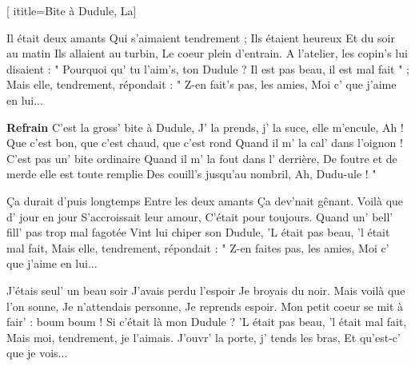[
  ititle={Bite à Dudule, La}]
  
\beginverse
Il était deux amants
Qui s'aimaient tendrement ;
Ils étaient heureux
Et du soir au matin
Ils allaient au turbin,
Le coeur plein d'entrain.
A l'atelier, les copin's lui disaient :
" Pourquoi qu' tu l'aim's, ton Dudule ?
Il est pas beau, il est mal fait " ;
Mais elle, tendrement, répondait :
" Z-en fait's pas, les amies,
Moi c' que j'aime en lui...
\endverse

\beginchorus
\textbf{Refrain}
C'est la gross' bite à Dudule,
J' la prends, j' la suce, elle m'encule,
Ah ! Que c'est bon, que c'est chaud, que c'est rond
Quand il m' la cal' dans l'oignon !
C'est pas un' bite ordinaire
Quand il m' la fout dans l' derrière,
De foutre et de merde elle est toute remplie
Des couill's jusqu'au nombril,
Ah, Dudu-ule ! "
\endchorus

\beginverse
Ça durait d'puis longtemps
Entre les deux amants
Ça dev'nait gênant.
Voilà que d' jour en jour
S'accroissait leur amour,
C'était pour toujours.
Quand un' bell' fill' pas trop mal fagotée
Vint lui chiper son Dudule,
'L était pas beau, 'l était mal fait,
Mais elle, tendrement, répondait :
" Z-en faites pas, les amies,
Moi c' que j'aime en lui...
\endverse

\beginverse
J'étais seul' un beau soir
J'avais perdu l'espoir
Je broyais du noir.
Mais voilà que l'on sonne,
Je n'attendais personne,
Je reprends espoir.
Mon petit coeur se mit à fair' : boum boum !
Si c'était là mon Dudule ?
'L était pas beau, 'l était mal fait,
Mais moi, tendrement, je l'aimais.
J'ouvr' la porte, j' tends les bras,
Et qu'est-c' que je vois...
\endverse

\endsong
